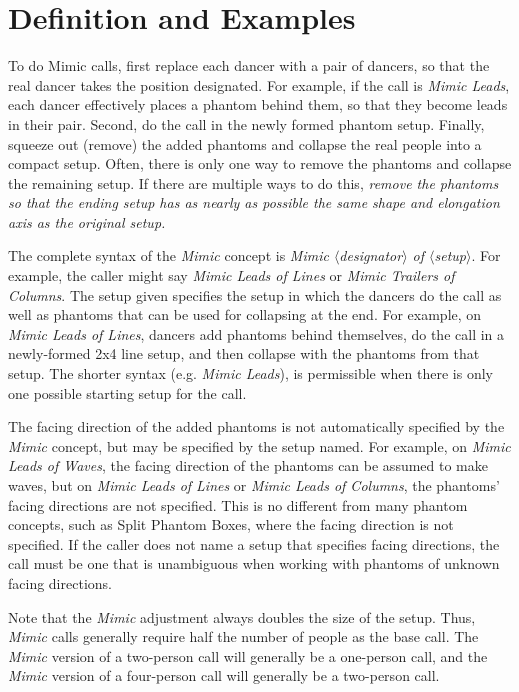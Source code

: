 \documentclass[12pt]{article}
\begin{document}
\section{Definition and Examples}

To do Mimic calls, first replace each dancer with a pair of dancers,
so that the real dancer takes the position designated.
For example, if the call is \emph{Mimic Leads},
each dancer effectively places a phantom behind them,
so that they become leads in their pair.
Second, do the call in the newly formed phantom setup.
Finally, squeeze out (remove) the added phantoms and collapse
the real people into a compact setup.
Often, there is only one way to remove the phantoms and
collapse the remaining setup.
If there are multiple ways to do this, 
\emph{remove the phantoms so that the ending setup
has as nearly as possible the same shape and elongation axis
as the original setup.}

The complete syntax of the \emph{Mimic} concept is
\emph{Mimic $\langle$designator$\rangle$ of $\langle$setup$\rangle$}.
For example, the caller might say \emph{Mimic Leads of Lines}
or \emph{Mimic Trailers of Columns}.
The setup given specifies the setup in which the dancers do the call
as well as phantoms that can be used for collapsing at the end.
For example, on \emph{Mimic Leads of Lines}, dancers add phantoms
behind themselves, do the call in a newly-formed 2x4 line setup,
and then collapse with the phantoms from that setup.
The shorter syntax (e.g. \emph{Mimic Leads}), is permissible
when there is only one possible starting setup for the call.

The facing direction of the added phantoms is not automatically
specified by the \emph{Mimic} concept, but may be specified by
the setup named.  For example, on \emph{Mimic Leads of Waves},
the facing direction of the phantoms can be assumed to make waves,
but on \emph{Mimic Leads of Lines} or \emph{Mimic Leads of Columns},
the phantoms' facing directions are not specified.
This is no different from many phantom concepts, 
such as Split Phantom Boxes, where the facing direction is not specified.
If the caller does not name a setup that specifies facing directions,
the call must be one that is unambiguous when
working with phantoms of unknown facing directions.

Note that the \emph{Mimic} adjustment always doubles the size of the setup.
Thus, \emph{Mimic} calls generally require half the number of people
as the base call.  The \emph{Mimic} version of a two-person call
will generally be a one-person call, and the \emph{Mimic} version
of a four-person call will generally be a two-person call.
\end{document}
